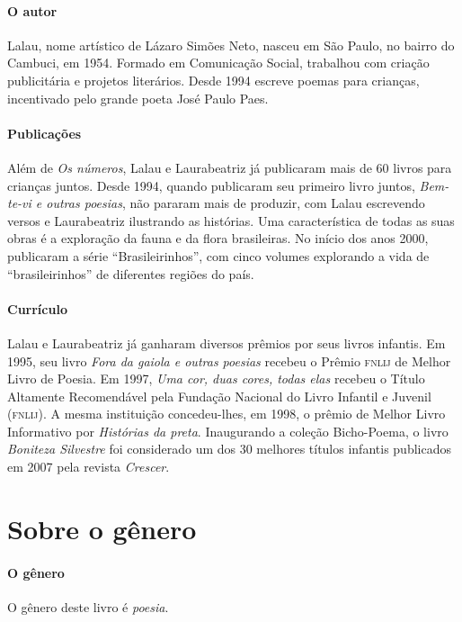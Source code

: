 \documentclass[11pt]{extarticle}
\begin{document}
\paragraph{O autor} Lalau, nome artístico de Lázaro Simões Neto, nasceu em São Paulo, no bairro do Cambuci, em 1954. Formado em Comunicação Social, trabalhou com criação publicitária e projetos literários. Desde 1994 escreve poemas para crianças, incentivado pelo grande poeta José Paulo Paes.

\paragraph{Publicações} Além de \textit{Os números}, Lalau e Laurabeatriz já publicaram mais de 60 livros para crianças juntos. Desde 1994, quando publicaram seu primeiro livro juntos, \textit{Bem-te-vi e outras poesias}, não pararam mais de produzir, com Lalau escrevendo versos e Laurabeatriz ilustrando as histórias. Uma característica de todas as suas obras é a exploração da fauna e da flora brasileiras. No início dos anos 2000, publicaram a série ``Brasileirinhos'', com cinco volumes explorando a vida de ``brasileirinhos'' de diferentes regiões do país. 

\paragraph{Currículo} Lalau e Laurabeatriz já ganharam diversos prêmios por seus livros infantis. Em 1995, seu livro \textit{Fora da gaiola e outras poesias} recebeu o Prêmio \textsc{fnlij} de Melhor Livro de Poesia. Em 1997, \textit{Uma cor, duas cores, todas elas} recebeu o Título Altamente Recomendável pela Fundação Nacional do Livro Infantil e Juvenil (\textsc{fnlij}). A mesma instituição concedeu-lhes, em 1998, o prêmio de Melhor Livro Informativo por \textit{Histórias da preta}. Inaugurando a coleção Bicho-Poema, o livro \textit{Boniteza Silvestre} foi considerado um dos 30 melhores títulos infantis publicados em 2007 pela revista \textit{Crescer}. 
 


\section{Sobre o gênero}

\paragraph{O gênero} O gênero deste livro é \textit{poesia}. 
\end{document}
